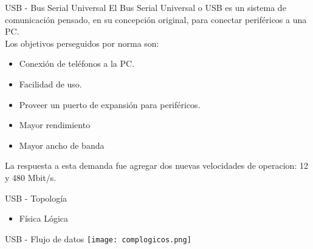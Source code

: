 \begin{frame}{USB - Bus Serial Universal}
		El Bus Serial Universal o USB es un sistema de comunicación pensado, en su concepción original, para conectar periféricos a una PC.\\
		Los objetivos perseguidos por norma son:

	\begin{itemize}
		\item Conexión de teléfonos a la PC.
		\item Facilidad de uso.
		\item Proveer un puerto de expansión para periféricos.
		\item<2-> \alert {Mayor rendimiento}
		\item<2-> \alert {Mayor ancho de banda}
	\end{itemize}
	
	 {La respuesta a esta demanda fue agregar dos nuevas velocidades de operacion: 12 y 480 Mbit/s.}
	
\end{frame}
\begin{frame}{USB - Topología}
	\centering
	\begin{itemize}
		\item {} {Física} \only<2> {Lógica}
	\end{itemize}
\end{frame}
\begin{frame}{USB - Flujo de datos}
	\centering
	\texttt{[image: complogicos.png]}
\end{frame}
